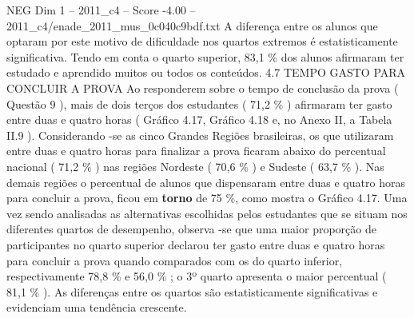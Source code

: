 \begin{textsample}{NEG Dim 1 – 2011\_c4 – Score -4.00 – 2011\_c4/enade\_2011\_mus\_0c040c9bdf.txt}
A diferença entre os alunos que optaram por este motivo de dificuldade nos quartos extremos é estatisticamente significativa.
Tendo em conta o quarto superior, 83,1 \% dos alunos afirmaram ter estudado e aprendido muitos ou todos os conteúdos. 4.7 TEMPO GASTO PARA CONCLUIR A PROVA Ao responderem sobre o tempo de conclusão da prova ( Questão 9 ), mais de dois terços dos estudantes ( 71,2 \% ) afirmaram ter gasto entre duas e quatro horas ( Gráfico 4.17, Gráfico 4.18 e, no Anexo II, a Tabela II.9 ).
Considerando -se as cinco Grandes Regiões brasileiras, os que utilizaram entre duas e quatro horas para finalizar a prova ficaram abaixo do percentual nacional ( 71,2 \% ) nas regiões Nordeste ( 70,6 \% ) e Sudeste ( 63,7 \% ).
Nas demais regiões o percentual de alunos que dispensaram entre duas e quatro horas para concluir a prova, ficou em \textbf{torno} de 75 \%, como mostra o Gráfico 4.17.
Uma vez sendo analisadas as alternativas escolhidas pelos estudantes que se situam nos diferentes quartos de desempenho, observa -se que uma maior proporção de participantes no quarto superior declarou ter gasto entre duas e quatro horas para concluir a prova quando comparados com os do quarto inferior, respectivamente 78,8 \% e 56,0 \% ; o 3º quarto apresenta o maior percentual ( 81,1 \% ).
As diferenças entre os quartos são estatisticamente significativas e evidenciam uma tendência crescente.

\end{textsample}
